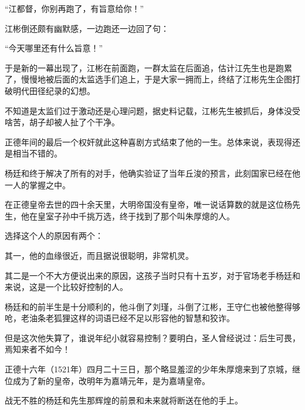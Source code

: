 \begin{multicols}{\theparacolNo}
“江都督，你别再跑了，有旨意给你！”

江彬倒还颇有幽默感，一边跑还一边回了句：

“今天哪里还有什么旨意！”

于是新的一幕出现了，江彬在前面跑，一群太监在后面追，估计江先生也是跑累了，慢慢地被后面的太监选手们追上，于是大家一拥而上，终结了江彬先生企图打破明代田径纪录的幻想。

不知道是太监们过于激动还是心理问题，据史料记载，江彬先生被抓后，身体没受啥苦，胡子却被人扯了个干净。

正德年间的最后一个权奸就此这种喜剧方式结束了他的一生。总体来说，表现得还是相当不错的。

杨廷和终于解决了所有的对手，他确实验证了当年丘浚的预言，此刻国家已经在他一人的掌握之中。

在正德皇帝去世的四十余天里，大明帝国没有皇帝，唯一说话算数的就是这位杨先生，他在皇室子孙中千挑万选，终于找到了那个叫朱厚熜的人。

选择这个人的原因有两个：

其一，他的血缘很近，而且据说很聪明，非常机灵。

其二是一个不大方便说出来的原因，这孩子当时只有十五岁，对于官场老手杨廷和来说，这是一个比较好控制的人。

杨廷和的前半生是十分顺利的，他斗倒了刘瑾，斗倒了江彬，王守仁也被他整得够呛，老油条老狐狸这样的词语已经不足以形容他的智慧和狡诈。

但是这次他失算了，谁说年纪小就容易控制？要明白，圣人曾经说过：后生可畏，焉知来者不如今！

正德十六年（1521年）四月二十三日，那个略显羞涩的少年朱厚熜来到了京城，继位成为了新的皇帝，改明年为嘉靖元年，是为嘉靖皇帝。

战无不胜的杨廷和先生那辉煌的前景和未来就将断送在他的手上。
\ifnum{}
	\end{multicols}
\fi
